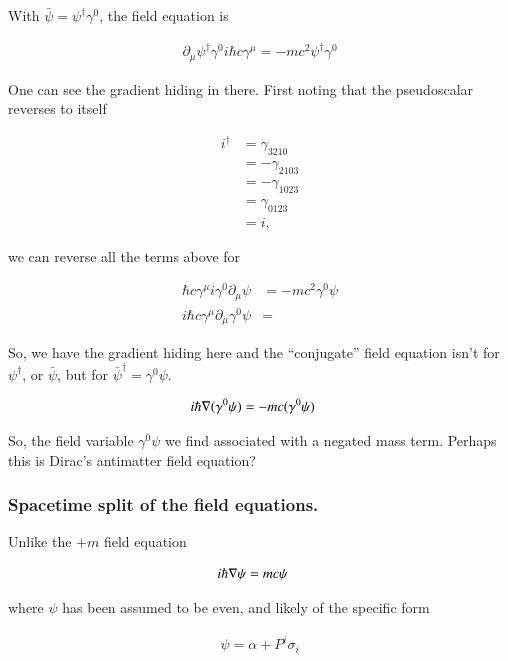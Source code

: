 \documentclass{article}
\begin{document}
With $\bar\psi = \psi^\dagger \gamma^0$, the field equation is

\begin{align*}
\partial_\mu \psi^\dagger \gamma^0 i \hbar c \gamma^\mu = -m c^2 \psi^\dagger \gamma^0
\end{align*}

One can see the gradient hiding in there.  First noting that the pseudoscalar reverses to itself

\begin{align*}
i^\dagger 
&= \gamma_{3210} \\
&= -\gamma_{2103} \\
&= -\gamma_{1023} \\
&= \gamma_{0123} \\
&= i,
\end{align*}

we can reverse all the terms above for

\begin{align*}
\hbar c \gamma^\mu i \gamma^0 \partial_\mu \psi &= -m c^2 \gamma^0 \psi \\
i \hbar c \gamma^\mu \partial_\mu \gamma^0 \psi &=
\end{align*}

So, we have the gradient hiding here and the ``conjugate'' field equation isn't for $\psi^\dagger$, or $\bar \psi$, but for ${\bar\psi}^\dagger = \gamma^0 \psi$.  

\begin{align}\label{eqn:antimatter}
i \hbar \nabla (\gamma^0 \psi) &= -m c (\gamma^0 \psi)
\end{align}

So, the field variable $\gamma^0 \psi$ we find associated with a negated mass term.  Perhaps this is Dirac's antimatter field equation?

\subsubsection{ Spacetime split of the field equations. }

Unlike the $+m$ field equation

\begin{align}\label{eqn:regularMatter}
i \hbar \nabla \psi &= m c \psi
\end{align}

where $\psi$ has been assumed to be even, and likely of the specific form

\begin{align*}
\psi = \alpha + P^i \sigma_i
\end{align*}
\end{document}
